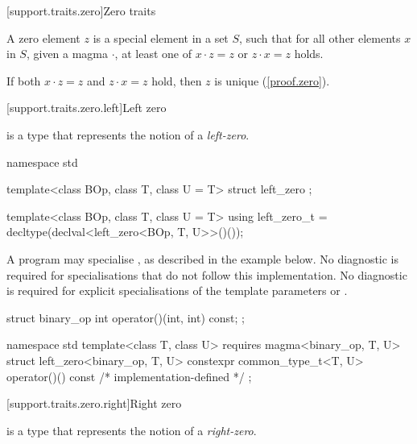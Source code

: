 [support.traits.zero]{Zero traits}

\pnum
A zero element $z$ is a special element in a set $S$, such that for all other elements $x$ in $S$,
given a magma $\cdot$, at least one of $x \cdot z = z$ or $z \cdot x = z$ holds.

\pnum
If both $x \cdot z = z$ and $z \cdot x = z$ hold, then $z$ is unique (\ref{proof.zero}).

[support.traits.zero.left]{Left zero}

\pnum
{} is a type that represents the notion of a \textit{left-zero}.

\begin{itemdecl}
namespace std {
  template<class BOp, class T, class U = T>
  struct left_zero {};

  template<class BOp, class T, class U = T>
  using left_zero_t = decltype(declval<left_zero<BOp, T, U>>()());
}
\end{itemdecl}
\begin{itemdescr}
   \pnum
   A program may specialise , as described in the example below. No diagnostic is
   required for specialisations that do not follow this implementation. No diagnostic is required for
   explicit specialisations of the template parameters  or .
\begin{example}
\begin{codeblock}
struct binary_op {
  int operator()(int, int) const;
};

namespace std {
  template<class T, class U>
  requires magma<binary_op, T, U>
  struct left_zero<binary_op, T, U> {
    constexpr common_type_t<T, U> operator()() const
    { /* implementation-defined */ }
  };
}
\end{codeblock}
\end{example}

\end{itemdescr}

[support.traits.zero.right]{Right zero}

\pnum
{} is a type that represents the notion of a \textit{right-zero}.

